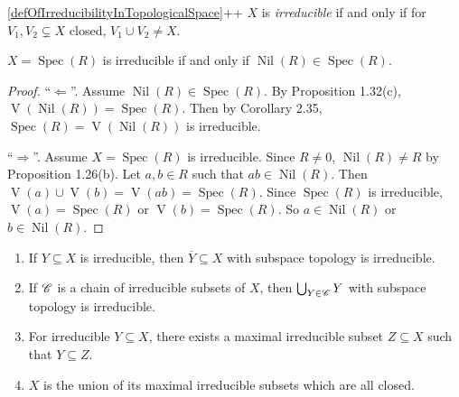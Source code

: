 \begin{customdefinition}{\ref{defOfIrreducibilityInTopologicalSpace}++}
    $X$ is \emph{irreducible} if and only if for $V_1,V_2 \subsetneq X$ closed, $V_1 \cup V_2 \neq X$.
\end{customdefinition}

\begin{proposition}
    $X = \operatorname{Spec}(R)$ is irreducible if and only if $\operatorname{Nil}(R) \in \operatorname{Spec}(R)$. 
\end{proposition}

\begin{proof}
    ``$\Leftarrow$''. Assume $\operatorname{Nil}(R) \in \operatorname{Spec}(R)$. By Proposition 1.32(c), $\operatorname{V}(\operatorname{Nil}(R)) = \operatorname{Spec}(R)$. Then by Corollary 2.35, $\operatorname{Spec}(R) = \operatorname{V}(\operatorname{Nil}(R))$ is irreducible. \par 
    ``$\Rightarrow$''. Assume $X = \operatorname{Spec}(R)$ is irreducible. Since $R \neq 0$, $\operatorname{Nil}(R) \neq R$ by Proposition 1.26(b). Let $a,b \in R$ such that $ab \in \operatorname{Nil}(R)$. Then $\operatorname{V}(a) \cup \operatorname{V}(b) = \operatorname{V}(ab) = \operatorname{Spec}(R)$. Since $\operatorname{Spec}(R)$ is irreducible, $\operatorname{V}(a) = \operatorname{Spec}(R)$ or $\operatorname{V}(b) = \operatorname{Spec}(R)$. So $a \in \operatorname{Nil}(R)$ or $b \in \operatorname{Nil}(R)$.
\end{proof}

\begin{proposition}
    \begin{enumerate}
        \item If $Y \subseteq X$ is irreducible, then $\overbar Y \subseteq X$ with subspace topology is irreducible.
        \item If $\mathscr{C}$ is a chain of irreducible subsets of $X$, then $\bigcup_{Y \in \mathscr{C}}Y$ with subspace topology is irreducible.
        \item For irreducible $Y \subseteq X$, there exists a maximal irreducible subset $Z \subseteq X$ such that $Y \subseteq Z$.
        \item $X$ is the union of its maximal irreducible subsets which are all closed. 
    \end{enumerate}
\end{proposition}


